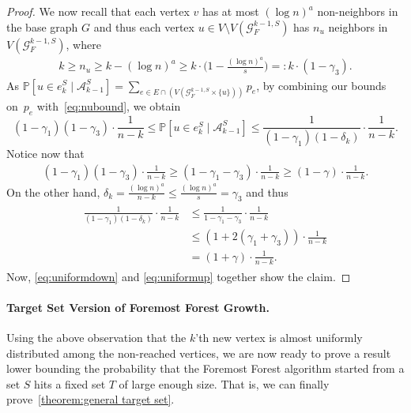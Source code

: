 \documentclass[a4paper,11pt]{article}
\theoremstyle{definition}
\theoremstyle{plain}
\newcommand{\GGG}{\mathcal{G}}
\newcommand{\A}{\mathcal A}
\newcommand{\prob}{\mathbb{P}}
\begin{document}
\begin{proof}
  We now recall that each vertex $v$ has at most $(\log n)^a$ non-neighbors in the base graph $G$ and thus each vertex $u\in V\setminus V(\GGG_F^{k-1,S})$ has $n_u$ neighbors in $V(\GGG_F^{k-1,S})$, where
  \begin{align}\label{eq:nubound}
    k
    \ge n_u
    \ge k - (\log n)^a
    \ge k \cdot \Big(1 - \frac{(\log n)^a}{s}\Big)
    =: k \cdot (1-\gamma_3).
  \end{align}
  As
  $
    \prob[u\in e_k^S \mid \A_{k-1}^S]
    = \sum_{e\in E\cap (V(\GGG_F^{k-1,S}\times \{u\}))} p_e
  $,
  by combining our bounds on~$p_e$ with~\eqref{eq:nubound}, we obtain
  \[
    (1-\gamma_1)(1-\gamma_3)\cdot \frac{1}{n-k}
    \le \prob[u\in e_k^S \mid \A_{k-1}^S]
    \le \frac{1}{(1-\gamma_1)(1-\delta_k)}\cdot \frac{1}{n-k}.
  \]
  Notice now that
  \begin{align}\label{eq:uniformdown}
    (1-\gamma_1)(1-\gamma_3)\cdot \frac{1}{n-k}
    \ge (1 - \gamma_1 - \gamma_3)\cdot \frac{1}{n-k}
    \geq (1 - \gamma)\cdot \frac{1}{n-k}.
  \end{align}
  On the other hand, $\delta_k= \frac{(\log n)^a}{n - k}\le \frac{(\log n)^a}{s}=\gamma_3$ and thus
  \begin{align}\label{eq:uniformup}
    \begin{split}
      \frac{1}{(1-\gamma_1)(1-\delta_k)}\cdot \frac{1}{n-k} 
      &\le \frac{1}{1-\gamma_1-\gamma_3} \cdot \frac{1}{n-k}
      \\ &\le \left(1 + 2(\gamma_1+\gamma_3) \right) \cdot \frac{1}{n-k}
      \\ &= (1 + \gamma) \cdot \frac{1}{n-k}.
    \end{split}
  \end{align}
  Now, \eqref{eq:uniformdown} and \eqref{eq:uniformup} together show the claim.
\end{proof}

\paragraph*{Target Set Version of Foremost Forest Growth.}
Using the above observation that the $k$'th new vertex is almost uniformly distributed among the non-reached vertices, we are now ready to prove a result lower bounding the probability that the Foremost Forest algorithm started from a set $S$ hits a fixed set $T$ of large enough size. That is, we can finally prove~\cref{theorem:general target set}.
\end{document}
